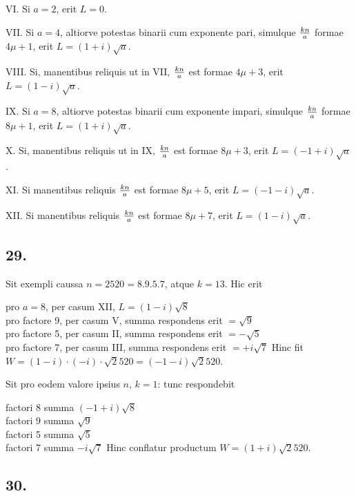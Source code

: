 \documentclass[twoside,12pt, showframe]{memoir}
\renewenvironment{quote}%
  {\list{}{\leftmargin=5em\rightmargin=0em}\item[]}%
  {\endlist}
\let\oldfrac\frac
\def\frac#1#2{\mathchoice{\tfrac{#1}{#2}}{\oldfrac{#1}{#2}}{\genfrac{}{}{}{2}{#1}{#2\mathstrut}}{\genfrac{}{}{}{3}{#1}{#2\mathstrut}}}
\begin{document}
VI. Si \(a=2\), erit \(L=0\).
 
VII. Si \(a=4\), altiorve potestas binarii cum exponente pari, simulque \(\frac{k n}{a}\) formae \(4 \mu+1\), erit \(L=(1+i) \surd a\).
 
VIII. Si, manentibus reliquis ut in VII, \(\frac{k n}{a}\) est formae \(4 \mu+3\), erit \(L=(1-i) \surd a\).
 
IX. Si \(a=8\), altiorve potestas binarii cum exponente impari, simulque \(\frac{k n}{a}\) formae \(8 \mu+1\), erit \(L=(1+i) \surd a\).\clearpage\noindent%
 
X. Si, manentibus reliquis ut in IX, \(\frac{k n}{a}\) est formae \(8 \mu+3\), erit \(L=(-1+i) \surd a\).
 
XI. Si manentibus reliquis \(\frac{k n}{a}\) est formae \(8 \mu+5\), erit \(L=(-1-i) \surd a\). 
 
XII. Si manentibus reliquis \(\frac{k n}{a}\) est formae \(8 \mu+7\), erit \(L=(1-i) \surd a\).

\subsection*{29.}
 
Sit exempli caussa \(n=2520=8 . 9 . 5 . 7\), atque \(k=13\). Hic erit
\begin{quote}pro \(a=8\), per casum XII, \(L=(1-i) \surd 8\)\\
pro factore 9, per casum V, summa respondens erit \(=\surd 9\)\\
pro factore 5, per casum II, summa respondens erit \(=-\surd 5\)\\
pro factore 7, per casum III, summa respondens erit \(=+i \surd 7\)
\end{quote}
Hinc fit \(W=(1-i) \cdot(-i) \cdot \surd 2520=(-1-i) \surd 2520\).

Sit pro eodem valore ipsius \(n\), \(k=1\): tunc respondebit
\begin{quote}factori 8 summa \((-1+i) \surd 8\)\\
factori 9 summa \(\surd 9\)\\
factori 5 summa \(\surd 5\)\\
factori 7 summa \(-i \surd 7\)\end{quote}
Hinc conflatur productum \(W=(1+i) \surd 2520\).

\subsection*{30.}
 
\end{document}
